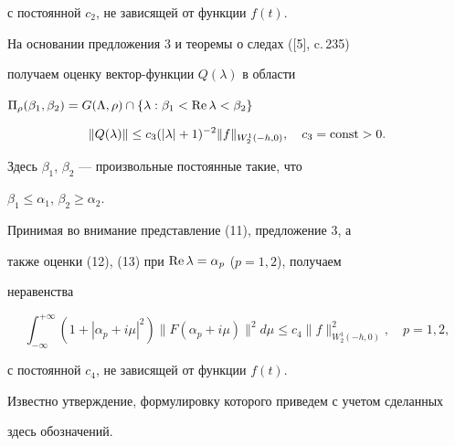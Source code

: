 с постоянной $c_2$, не зависящей от функции $f(t)$. 


 


На основании предложения 3 и теоремы о следах ([5], c.\,235) 


получаем оценку вектор-функции $Q(\lambda)$ в области 


$\Pi_\rho(\beta_1,\beta_2)=G(\Lambda,\rho)\cap\{\lambda: 


\beta_1<\re\lambda<\beta_2\}$ 


\begin{equation} 


\|Q(\lambda)\|\le c_3(|\lambda|+1)^{-2} 


\|f\|_{W^1_2(-h,0)},\quad c_3=\const>0. 


\end{equation} 


Здесь $\beta_1$, $\beta_2$ --- произвольные постоянные такие, что 


$\beta_1\le\alpha_1$, $\beta_2\ge\alpha_2$. 


Принимая во внимание представление (11), предложение 3, а 


также оценки (12), (13) при $\operatorname{Re}\lambda=\alpha_p$ ($p=1,2$), получаем 


неравенства 


\begin{equation} 


\int^{+\infty}_{-\infty}(1+|\alpha_p+i\mu|^2) 


\|F(\alpha_p+i\mu)\|^2d\mu\le c_4 


\|f\|^2_{W^1_2(-h,0)},\quad p=1,2, 


\end{equation} 


с постоянной $c_4$, не зависящей от функции $f(t)$. 


 


Известно утверждение, формулировку которого приведем с учетом сделанных 


здесь обозначений. 


 


